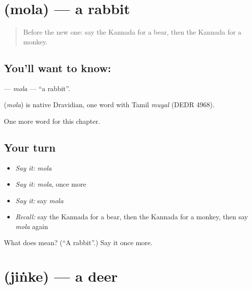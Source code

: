\section[\texorpdfstring{\kn{ಮೊಲ} (mola)}{ಮೊಲ (mola)}]{ (mola) — a rabbit}

\label{lesson:KA-C130-mola}



\begin{quote}
Before the new one: say the Kannada for a bear, then the Kannada for a monkey.
\end{quote}

\subsection*{You'll want to know: }
\textbf{} — \emph{mola} — \textquotedblleft{}a rabbit\textquotedblright{}.

\begin{cousinweb}
\textbf{} (\emph{mola}) is native Dravidian, one word with Tamil \emph{muyal} (DEDR 4968).
\end{cousinweb}

\begin{grammarlens}[title={What you've built}]
One more word for this chapter.
\end{grammarlens}

\subsection*{Your turn}
\begin{itemize}
\raggedright
  \item \emph{Say it:} \emph{mola}
  \item \emph{Say it:} \emph{mola}, once more
  \item \emph{Say it:} say \emph{mola}
  \item \emph{Recall:} say the Kannada for a bear, then the Kannada for a monkey, then say \emph{mola} again
\end{itemize}

\begin{tcolorbox}[breakable,colback=teal!4,colframe=teal!35!black,title={Before you move on}]
What does  mean? (\textquotedblleft{}A rabbit\textquotedblright{}.) Say it once more.
\end{tcolorbox}
\section[\texorpdfstring{\kn{ಜಿಂಕೆ} (jiṅke)}{ಜಿಂಕೆ (jiṅke)}]{ (jiṅke) — a deer}

